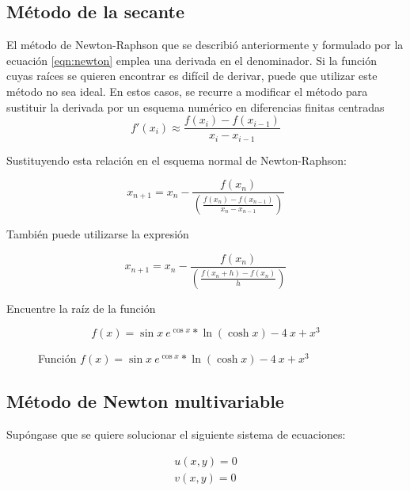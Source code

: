 \subsection{Método de la secante}

El método de Newton-Raphson que se describió anteriormente y formulado por la
ecuación \ref{eqn:newton} emplea una derivada en el denominador. Si la función
cuyas raíces se quieren encontrar es difícil de derivar, puede que utilizar este
método no sea ideal. En estos casos, se recurre a modificar el método para
sustituir la derivada por un esquema numérico en diferencias finitas centradas
\[
    f'(x_i) \approx \frac{f(x_i) - f(x_{i-1})}{x_i - x_{i-1}}
\]

Sustituyendo esta relación en el esquema normal de Newton-Raphson:

\begin{equation}\label{eqn:secante}
    \boxed{x_{n+1} = x_n - \frac{f(x_n)}{ \left( \frac{f(x_n) - f(x_{n-1})}{x_n - x_{n-1}} \right)}}
\end{equation}

También puede utilizarse la expresión

\begin{equation}\label{eqn:secante-2}
    \boxed{x_{n+1} = x_n - \frac{f(x_n)}{ \left( \frac{f(x_n + h) - f(x_n)}{h} \right)}}
\end{equation}


\begin{ex}
    Encuentre la raíz de la función

    \[
        f(x) = \sin x\ e^{\cos x} * \ln(\cosh x) - 4\ x + x^3
    \]

    \begin{figure}
        \centering
        \caption{Función $f(x) = \sin x\ e^{\cos x} * \ln(\cosh x) - 4\ x + x^3$}
        \label{fig:ejercicio-secante}
    \end{figure}


\end{ex}

\subsection{Método de Newton multivariable}

Supóngase que se quiere solucionar el siguiente sistema de ecuaciones:

\begin{align*}
    u(x,y) = 0 \\
    v(x,y) = 0
\end{align*}
